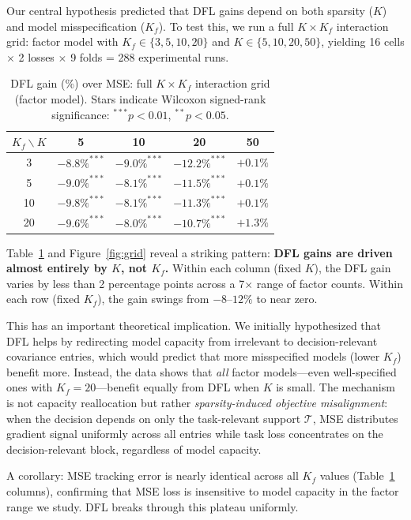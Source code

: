\documentclass[letterpaper]{article}
\begin{document}
Our central hypothesis predicted that DFL gains depend on both sparsity ($K$) and model misspecification ($K_f$). To test this, we run a full $K \times K_f$ interaction grid: factor model with $K_f \in \{3, 5, 10, 20\}$ and $K \in \{5, 10, 20, 50\}$, yielding 16 cells $\times$ 2 losses $\times$ 9 folds = 288 experimental runs.

\begin{table}[h]
\centering
\caption{DFL gain (\%) over MSE: full $K \times K_f$ interaction grid (factor model). Stars indicate Wilcoxon signed-rank significance: $^{***}p<0.01$, $^{**}p<0.05$.}
\label{tab:exp2}
\small
\begin{tabular}{@{}c|cccc@{}}
\toprule
$K_f \backslash K$ & 5 & 10 & 20 & 50 \\
\midrule
3  & $-8.8\%^{***}$  & $-9.0\%^{***}$  & $-12.2\%^{***}$ & $+0.1\%$ \\
5  & $-9.0\%^{***}$  & $-8.1\%^{***}$  & $-11.5\%^{***}$ & $+0.1\%$ \\
10 & $-9.8\%^{***}$  & $-8.1\%^{***}$  & $-11.3\%^{***}$ & $+0.1\%$ \\
20 & $-9.6\%^{***}$  & $-8.0\%^{***}$  & $-10.7\%^{***}$ & $+1.3\%$ \\
\bottomrule
\end{tabular}
\end{table}

Table~\ref{tab:exp2} and Figure~\ref{fig:grid} reveal a striking pattern: \textbf{DFL gains are driven almost entirely by $K$, not $K_f$.} Within each column (fixed $K$), the DFL gain varies by less than 2 percentage points across a 7$\times$ range of factor counts. Within each row (fixed $K_f$), the gain swings from $-8$--$12\%$ to near zero.

This has an important theoretical implication. We initially hypothesized that DFL helps by redirecting model capacity from irrelevant to decision-relevant covariance entries, which would predict that more misspecified models (lower $K_f$) benefit more. Instead, the data shows that \emph{all} factor models---even well-specified ones with $K_f = 20$---benefit equally from DFL when $K$ is small. The mechanism is not capacity reallocation but rather \emph{sparsity-induced objective misalignment}: when the decision depends on only the task-relevant support $\mathcal{T}$, MSE distributes gradient signal uniformly across all entries while task loss concentrates on the decision-relevant block, regardless of model capacity.

A corollary: MSE tracking error is nearly identical across all $K_f$ values (Table~\ref{tab:exp2} columns), confirming that MSE loss is insensitive to model capacity in the factor range we study. DFL breaks through this plateau uniformly.
\end{document}
